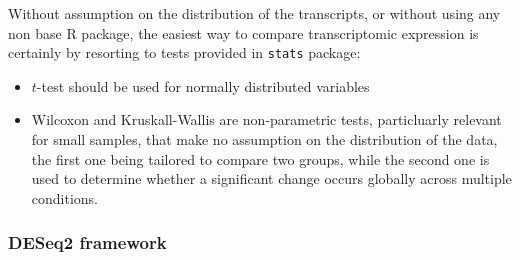 Without assumption on the distribution of the transcripts, or without using any non base R package, the easiest way to compare transcriptomic expression is certainly by resorting to tests provided in \texttt{stats} package:

\begin{itemize}

\item
  \(t\)-test should be used for normally distributed variables
\item
  Wilcoxon and Kruskall-Wallis are non-parametric tests, particluarly relevant for small samples, that make no assumption on the distribution of the data, the first one being tailored to compare two groups, while the second one is used to determine whether a significant change occurs globally across multiple conditions. 
\end{itemize}

\begin{Shaded}
\begin{Highlighting}
\OtherTok{\textless{}{-}} \NormalTok{(}\NormalTok{)}


\OtherTok{\textless{}{-}} \NormalTok{(}
   \NormalTok{,}
   \NormalTok{,}
   \NormalTok{)}

\OtherTok{\textless{}{-}} \NormalTok{(}
   \NormalTok{,}
   \NormalTok{,}
   \NormalTok{)}
\end{Highlighting}
\end{Shaded}


\subsubsection{DESeq2 framework} 
\label{deseq2-framework}

